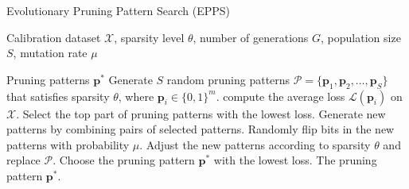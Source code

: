 \begin{algorithm}[t]
\caption{Evolutionary Pruning Pattern Search (EPPS)}
\label{alg:algo2}
\begin{algorithmic}[1]

\REQUIRE Calibration dataset \( \mathcal{X}\), sparsity level \( \theta\), number of generations \( G \), population size \( S \), mutation rate \( \mu \)

\ENSURE Pruning patterns \( \mathbf{p^*} \)
\STATE  Generate \( S \) random pruning patterns \(  \mathcal{P} =\{\mathbf{p}_1, \mathbf{p}_2, \dots, \mathbf{p}_S\} \) that satisfies sparsity \( \theta\), where \( \mathbf{p}_i \in \{0, 1\}^m \).
        \STATE compute the average loss \( \mathcal{L}(\mathbf{p}_i) \) on \( \mathcal{X}\).
    \ENDFOR
    \STATE  Select the top part of pruning patterns with the lowest loss.
    \STATE Generate new patterns by combining pairs of selected patterns.
    \STATE Randomly flip bits in the new patterns with probability \( \mu \).
    \STATE Adjust the new patterns according to sparsity \(\theta\) and replace \(\mathcal{P}\).
\ENDFOR
\STATE Choose the pruning pattern \( \mathbf{p^*} \) with the lowest loss.
\RETURN The pruning pattern \( \mathbf{p^*}\).

\end{algorithmic}
\end{algorithm}

